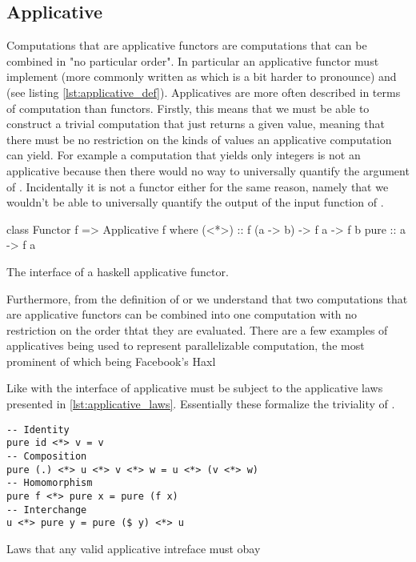   \subsection{Applicative}

  Computations that are applicative
  \cite{mcbrideApplicativeProgrammingEffects2008} functors are
  computations that can be combined in "no particular order". In
  particular an applicative functor must implement  (more commonly written as \hask{<*>} which is a bit
  harder to pronounce) and  (see listing
  \ref{lst:applicative_def}). Applicatives are more often described in
  terms of computation than functors. Firstly, this means that we must
  be able to construct a trivial computation that just returns a given
  value, meaning that there must be no restriction on the kinds of
  values an applicative computation can yield. For example a computation
  that yields only integers is not an applicative because then there
  would no way to universally quantify the argument of
  . Incidentally it is not a functor either for the same
  reason, namely that we wouldn't be able to universally quantify the
  output of the input function of .

  \begin{code}
\begin{haskellcode}
class Functor f => Applicative f  where
  (<*>) :: f (a -> b) -> f a -> f b
  pure :: a -> f a
\end{haskellcode}
    \caption{\label{lst:applicative_def}The interface of a haskell applicative functor.}
  \end{code}

  Furthermore, from the definition of  or \hask{<*>} we
  understand that two computations that are applicative functors can be
  combined into one computation with no restriction on the order thtat
  they are evaluated. There are a few examples of applicatives being
  used to represent parallelizable computation, the most prominent of
  which being Facebook's Haxl \cite{marlowHaxlProjectFacebook2013}

  Like with  the interface of applicative must be subject
  to the applicative laws presented in
  \ref{lst:applicative_laws}. Essentially these formalize the triviality
  of .

  \begin{code}
\begin{verbatim}
-- Identity
pure id <*> v = v
-- Composition
pure (.) <*> u <*> v <*> w = u <*> (v <*> w)
-- Homomorphism
pure f <*> pure x = pure (f x)
-- Interchange
u <*> pure y = pure ($ y) <*> u
\end{verbatim}
    \caption{\label{lst:applicative_laws}Laws that any valid applicative
      intreface must obay}
  \end{code}

